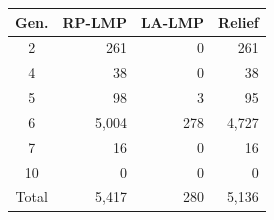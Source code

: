 \begin{tabular}{crrr}
\toprule
Gen. & RP-LMP & LA-LMP & Relief \\
\midrule
2 & 261 & 0 & 261 \\
4 & 38 & 0 & 38 \\
5 & 98 & 3 & 95 \\
6 & 5,004 & 278 & 4,727 \\
7 & 16 & 0 & 16 \\
10 & 0 & 0 & 0 \\
\midrule
Total & 5,417 & 280 & 5,136 \\
\bottomrule
\end{tabular}
